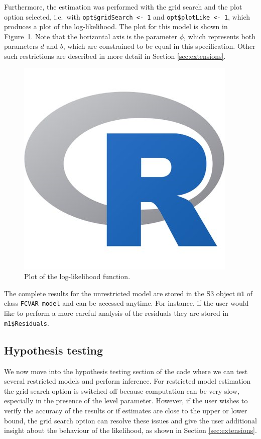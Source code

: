 \documentclass[article]{jss}
\begin{document}
Furthermore, the estimation was performed with the grid search and the plot option selected, i.e.\ with \verb|opt$gridSearch <- 1| and \verb|opt$plotLike <- 1|, which produces a plot of the log-likelihood. The plot for this model is shown in Figure~\ref{fig:m1_likelihood}.
Note that the horizontal axis is the parameter $\phi$, which represents both parameters $d$ and $b$, 
which are constrained to be equal in this specification. 
Other such restrictions are described in more detail in Section \ref{sec:extensions}. 

\begin{figure}[H]
  \centering
  \includegraphics[scale = .6, keepaspectratio=true]{Figures/m1_likelihood.png}
  \caption{Plot of the log-likelihood function.}
  \label{fig:m1_likelihood}
\end{figure}

The complete results for the unrestricted model are stored in the S3 object \verb|m1| of class \verb|FCVAR_model| and can be accessed anytime. For instance, if the user would like to perform a more careful analysis of the residuals they are stored in \verb|m1$Residuals|.

\subsection{Hypothesis testing}
\label{subsec hypo}

We now move into the hypothesis testing section of the code where we can test several restricted models and perform inference. For restricted model estimation the grid search option is switched off because computation can be very slow, especially in the presence of the level parameter. However, if the user wishes to verify the accuracy of the results or if estimates are close to the upper or lower bound, the grid search option can resolve these issues and give the user additional insight about the behaviour of the likelihood, as shown in Section \ref{sec:extensions}. 
\end{document}
